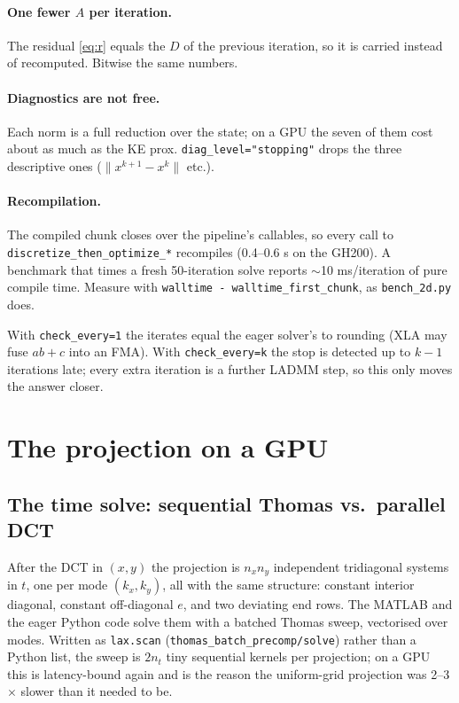 \documentclass[11pt]{article}
\newcommand{\code}[1]{\texttt{#1}}
\begin{document}
\paragraph{One fewer $A$ per iteration.} The residual \eqref{eq:r} equals the $D$ of the
previous iteration, so it is carried instead of recomputed. Bitwise the same numbers.

\paragraph{Diagnostics are not free.} Each norm is a full reduction over the state; on a
GPU the seven of them cost about as much as the KE prox. \code{diag\_level="stopping"}
drops the three descriptive ones ($\|x^{k+1}-x^k\|$ etc.).

\paragraph{Recompilation.} The compiled chunk closes over the pipeline's callables, so
every call to \code{discretize\_then\_optimize\_*} recompiles (0.4--0.6 s on the GH200).
A benchmark that times a fresh 50-iteration solve reports $\sim$10 ms/iteration of pure
compile time. Measure with \code{walltime - walltime\_first\_chunk}, as
\code{bench\_2d.py} does.

With \code{check\_every=1} the iterates equal the eager solver's to rounding (XLA may
fuse $a b + c$ into an FMA). With \code{check\_every=k} the stop is detected up to $k-1$
iterations late; every extra iteration is a further LADMM step, so this only moves the
answer closer.

\section{The projection on a GPU}\label{sec:proj}

\subsection{The time solve: sequential Thomas vs.\ parallel DCT}\label{sec:timesolve}

After the DCT in $(x,y)$ the projection is $n_x n_y$ independent tridiagonal systems in
$t$, one per mode $(k_x,k_y)$, all with the same structure: constant interior diagonal,
constant off-diagonal $e$, and two deviating end rows. The MATLAB and the eager Python
code solve them with a batched Thomas sweep, vectorised over modes. Written as
\code{lax.scan} (\code{thomas\_batch\_precomp/solve}) rather than a Python list, the
sweep is $2 n_t$ tiny sequential kernels per projection; on a GPU this is latency-bound
again and is the reason the uniform-grid projection was 2--3$\times$ slower than it
needed to be.
\end{document}
